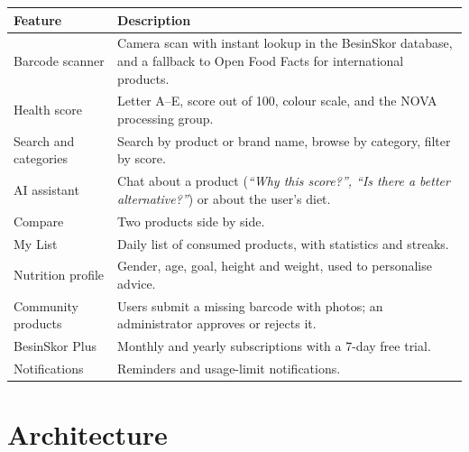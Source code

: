 \documentclass[a4paper,11pt]{article}
\begin{document}
\begin{tabularx}{\linewidth}{@{}lX@{}}
\toprule
\textbf{Feature} & \textbf{Description} \\
\midrule
Barcode scanner & Camera scan with instant lookup in the BesinSkor database, and a fallback to Open Food Facts for international products. \\
Health score & Letter A--E, score out of 100, colour scale, and the NOVA processing group. \\
Search and categories & Search by product or brand name, browse by category, filter by score. \\
AI assistant & Chat about a product (\emph{``Why this score?'', ``Is there a better alternative?''}) or about the user's diet. \\
Compare & Two products side by side. \\
My List & Daily list of consumed products, with statistics and streaks. \\
Nutrition profile & Gender, age, goal, height and weight, used to personalise advice. \\
Community products & Users submit a missing barcode with photos; an administrator approves or rejects it. \\
BesinSkor Plus & Monthly and yearly subscriptions with a 7-day free trial. \\
Notifications & Reminders and usage-limit notifications. \\
\bottomrule
\end{tabularx}

\section{Architecture}
\end{document}
